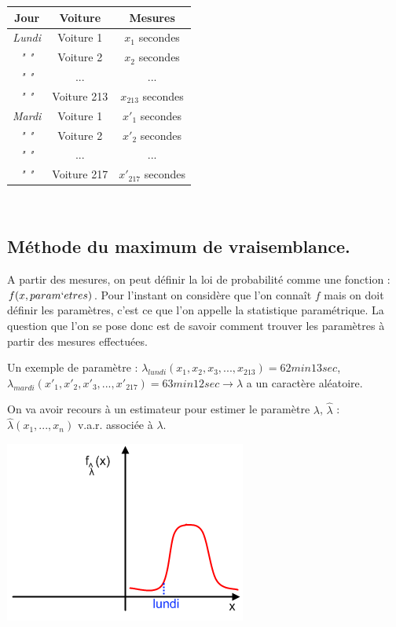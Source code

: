 \documentclass{article}
\newcommand{\lcha}{\hat{\lambda}}
\begin{document}
\begin{tabular}{|*{3}{c|}}
\hline
\textbf{Jour} & \textbf{Voiture} & \textbf{Mesures} \\
\hline
\textit{Lundi} & Voiture 1 & $x_1$ secondes \\
\hline
\textit{" "} & Voiture 2 & $x_2$ secondes \\
\hline
\textit{" "} & ... & ... \\
\hline
\textit{" "} & Voiture 213 & $x_{213}$ secondes \\
\hline
\textit{Mardi} & Voiture 1 & $x'_1$ secondes \\
\hline
\textit{" "} & Voiture 2 & $x'_2$ secondes \\
\hline
\textit{" "} & ... & ... \\
\hline
\textit{" "} & Voiture 217 & $x'_{217}$ secondes \\
\hline
\end{tabular} \\

\subsection{Méthode du maximum de vraisemblance.}

A partir des mesures, on peut définir la loi de probabilité comme une fonction : $f(x,param`{e}tres)$. Pour l'instant on 
considère que l'on connaît $f$ mais on doit définir les paramètres, c'est ce que l'on appelle la statistique paramétrique.
La question que l'on se pose donc est de savoir comment trouver les paramètres à partir des mesures effectuées.

\noindent Un exemple de paramètre : $\lambda_{lundi}(x_1,x_2,x_3,...,x_{213}) = 62 min 13 sec$, \\
\indent\indent\indent\indent\indent\indent\indent\indent $\lambda_{mardi}(x'_1,x'_2,x'_3,...,x'_{217}) 
= 63 min 12 sec \rightarrow \lambda$ a un caractère aléatoire.

\noindent On va avoir recours à un estimateur pour estimer le paramètre $\lambda$, $\lcha$ : $\lcha(x_1,...,x_n)$
v.a.r. associée à $\lambda$.

\includegraphics{Figure2-2.png}
\end{document}
